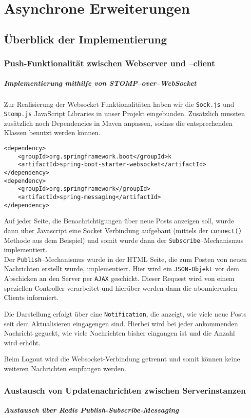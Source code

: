 \chapter{Asynchrone Erweiterungen}
\section{Überblick der Implementierung}
\subsection{Push-Funktionalität zwischen Webserver und --client}
\paragraph{Implementierung mithilfe von STOMP--over--WebSocket}
Zur Realisierung der Websocket Funktionalitäten haben wir die \texttt{Sock.js} und \texttt{Stomp.js} JavaScript Libraries in unser Projekt eingebunden. Zusätzlich mussten zusätzlich noch Dependencies in Maven anpassen, sodass die entsprechenden Klassen benutzt werden können.
\begin{verbatim}
<dependency>
    <groupId>org.springframework.boot</groupId>k
    <artifactId>spring-boot-starter-websocket</artifactId>
</dependency>
<dependency>
    <groupId>org.springframework</groupId>
    <artifactId>spring-messaging</artifactId>
</dependency>
\end{verbatim}

Auf jeder Seite, die Benachrichtigungen über neue Posts anzeigen soll, wurde dann über Javascript eine Socket Verbindung aufgebaut (mittels der \texttt{connect()} Methode aus dem Beispiel) und somit wurde dann der \texttt{Subscribe}--Mechanismus implementiert.\\
Der \texttt{Publish}--Mechanismus wurde in der HTML Seite, die zum Posten von neuen Nachrichten erstellt wurde, implementiert. Hier wird ein \texttt{JSON-Objekt} vor dem Abschicken an den Server per \texttt{AJAX} geschickt. Dieser Request wird von einem speziellen Controller verarbeitet und hierüber werden dann die abonnierenden Clients informiert.

Die Darstellung erfolgt über eine \texttt{Notification}, die anzeigt, wie viele neue Posts seit dem Aktualisieren eingagengen sind. Hierbei wird bei jeder ankommenden Nachricht geguckt, wie viele Nachrichten bisher eingangen ist und die Anzahl wird erhöht.

Beim Logout wird die Websocket-Verbindung getrennt und somit können keine weiteren Nachrichten empfangen werden.

\subsection{Austausch von Updatenachrichten zwischen
Serverinstanzen}
\paragraph{Austausch über Redis Publish-Subscribe-Messaging}
